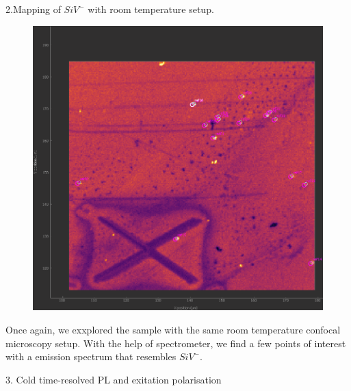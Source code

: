 2.Mapping of $SiV^{-}$ with room temperature setup.
\FloatBarrier
\begin{figure}[h]
\centering
\includegraphics[width=0.7\linewidth]{Figures/pic/dc}
\caption{}
\label{fig:dc}
\end{figure}
\FloatBarrier
Once again, we exxplored the sample with the same room temperature confocal microscopy setup. With the help of spectrometer, we find a few points of interest with a emission spectrum that resembles $SiV^{-}$. 

3. Cold time-resolved PL and exitation polarisation

